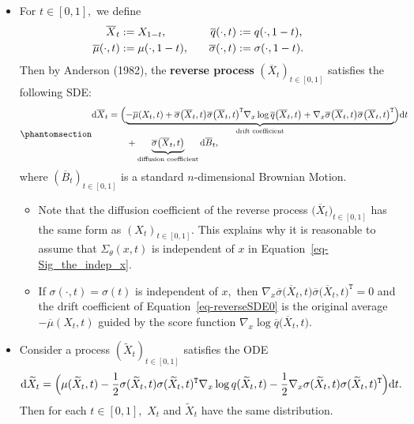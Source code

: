 \documentclass[
]{article}
\theoremstyle{remark}
\begin{document}
\begin{itemize}
\item
  For \(t\in [0,1],\) we define \[
  \begin{aligned}
    \overline{X}_t &:= X_{1-t}, \quad  &
    \overline{q}(\cdot , t) &:= q(\cdot , 1-t), \quad\cr 
    \overline{\mu}(\cdot , t) &:= \mu(\cdot , 1-t), \quad  &
    \overline{\sigma}(\cdot , t) &:= \sigma( \cdot , 1-t ).
  \end{aligned}
  \] Then by Anderson (1982), the \textbf{reverse process}
  \((\overline{X}_t)_{t\in [0,1]}\) satisfies the following SDE:
  \begin{equation}\phantomsection\label{eq-reverseSDE0}{
  \begin{aligned}
    \mathrm{d} \overline{X}_t 
    &= \Bigl( \underbrace{-\overline{\mu}(X_t,t) + 
      \overline{\sigma} \bigl( \overline{X}_t,t \bigr) \overline{\sigma} \bigl( \overline{X}_t,t \bigr)^{\mathtt{T}} \nabla_{x} \log \overline{q}\bigl( \overline{X}_t,t \bigr) 
      + \nabla_x  \overline{\sigma} \bigl( \overline{X}_t,t \bigr) \overline{\sigma} \bigl( \overline{X}_t,t \bigr)^{\mathtt{T}}}_{\text{drift coefficient}}
      \Bigr) \mathrm{d}t  \cr 
    & \qquad + \underbrace{\overline{\sigma}\bigl( \overline{X}_t,t \bigr)}_{\text{diffusion coefficient}} \mathrm{d}\overline{B}_t,
  \end{aligned}
  }\end{equation} where \((\overline{B}_t)_{t\in [0,1]}\) is a standard
  \(n\)-dimensional Brownian Motion.

  \begin{itemize}
  \item
    Note that the diffusion coefficient of the reverse process
    \(\bigl( \overline{X}_t \bigr)_{t\in [0,1]}\) has the same form as
    \((X_t)_{t\in [0,1]}.\) This explains why it is reasonable to assume
    that \(\Sigma_{\theta}(x,t)\) is independent of \(x\) in
    Equation~\ref{eq-Sig_the_indep_x}.
  \item
    If \(\sigma(\cdot ,t)=\sigma(t)\) is independent of \(x,\) then
    \(\nabla_x  \overline{\sigma} \bigl( \overline{X}_t,t \bigr) \overline{\sigma} \bigl( \overline{X}_t,t \bigr)^{\mathtt{T}}=0\)
    and the drift coefficient of Equation~\ref{eq-reverseSDE0} is the
    original average \(-\overline{\mu}(X_t,t)\) guided by the score
    function
    \(\nabla_{x} \log \overline{q}\bigl( \overline{X}_t,t \bigr).\)
  \end{itemize}
\item
  Consider a process \((\widetilde{X}_t)_{t\in[0,1]}\) satisfies the ODE
  \[
  \begin{aligned}
    \mathrm{d}\widetilde{X}_t 
    = \Bigl( \mu(\widetilde{X}_t, t) 
    - \frac{1}{2} \sigma(\widetilde{X}_t,t) \sigma(\widetilde{X}_t,t)^{\mathtt{T}} \nabla_{x} \log q(\widetilde{X}_t,t) 
    - \frac{1}{2} \nabla_x \sigma(\widetilde{X}_t,t) \sigma(\widetilde{X}_t,t)^{\mathtt{T}} \Bigr) \mathrm{d}t.
  \end{aligned}
  \] Then for each \(t\in [0,1],\) \(X_t\) and \(\widetilde{X}_t\) have
  the same distribution.
\end{itemize}
\end{document}
